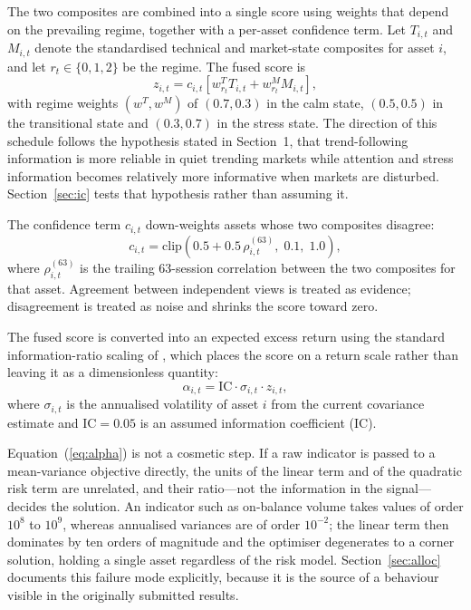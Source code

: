 \documentclass{singlecol-new}
\theoremstyle{TH}{
\newtheorem{lemma}{Lemma}
\newtheorem{theorem}[lemma]{Theorem}
\newtheorem{corrolary}[lemma]{Corrolary}
\newtheorem{conjecture}[lemma]{Conjecture}
\newtheorem{proposition}[lemma]{Proposition}
\newtheorem{claim}[lemma]{Claim}
\newtheorem{stheorem}[lemma]{Wrong Theorem}
\newtheorem{algorithm}{Algorithm}
}
\theoremstyle{THrm}{
\newtheorem{definition}{Definition}[section]
\newtheorem{question}{Question}[section]
\newtheorem{remark}{Remark}
\newtheorem{scheme}{Scheme}
}
\theoremstyle{THhit}{
\newtheorem{case}{Case}[section]
}
\begin{document}
The two composites are combined into a single score using weights that depend on the
prevailing regime, together with a per-asset confidence term. Let $T_{i,t}$ and
$M_{i,t}$ denote the standardised technical and market-state composites for asset $i$,
and let $r_t \in \{0,1,2\}$ be the regime. The fused score is
\begin{equation}
z_{i,t} = c_{i,t} \left[ w^{T}_{r_t} T_{i,t} + w^{M}_{r_t} M_{i,t} \right],
\end{equation}
with regime weights $(w^T, w^M)$ of $(0.7, 0.3)$ in the calm state, $(0.5, 0.5)$ in the
transitional state and $(0.3, 0.7)$ in the stress state. The direction of this schedule
follows the hypothesis stated in Section~1, that trend-following information is more
reliable in quiet trending markets while attention and stress information becomes
relatively more informative when markets are disturbed. Section~\ref{sec:ic} tests that
hypothesis rather than assuming it.

The confidence term $c_{i,t}$ down-weights assets whose two composites disagree:
\begin{equation}
c_{i,t} = \mathrm{clip}\!\left(0.5 + 0.5\,\rho^{(63)}_{i,t}, \; 0.1, \; 1.0\right),
\end{equation}
where $\rho^{(63)}_{i,t}$ is the trailing 63-session correlation between the two
composites for that asset. Agreement between independent views is treated as evidence;
disagreement is treated as noise and shrinks the score toward zero.

The fused score is converted into an expected excess return using the standard
information-ratio scaling of \citet{grinold00}, which places the score on a return
scale rather than leaving it as a dimensionless quantity:
\begin{equation}
\alpha_{i,t} = \mathrm{IC} \cdot \sigma_{i,t} \cdot z_{i,t},
\label{eq:alpha}
\end{equation}
where $\sigma_{i,t}$ is the annualised volatility of asset $i$ from the current
covariance estimate and $\mathrm{IC} = 0.05$ is an assumed information coefficient (IC).

Equation~(\ref{eq:alpha}) is not a cosmetic step. If a raw indicator is passed to a
mean-variance objective directly, the units of the linear term and of the quadratic
risk term are unrelated, and their ratio---not the information in the signal---decides
the solution. An indicator such as on-balance volume takes values of order $10^{8}$ to
$10^{9}$, whereas annualised variances are of order $10^{-2}$; the linear term then
dominates by ten orders of magnitude and the optimiser degenerates to a corner
solution, holding a single asset regardless of the risk model. Section~\ref{sec:alloc}
documents this failure mode explicitly, because it is the source of a behaviour visible
in the originally submitted results.
\end{document}
